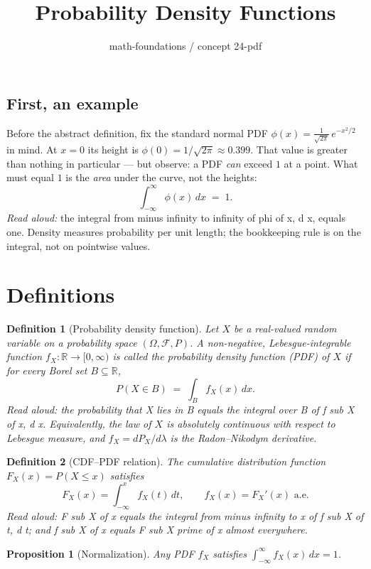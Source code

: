 \documentclass[11pt]{article}
\title{Probability Density Functions}
\author{math-foundations / concept 24-pdf}
\date{}
\newtheorem{definition}{Definition}
\newtheorem{proposition}{Proposition}
\begin{document}
\maketitle

\subsection*{First, an example}
Before the abstract definition, fix the standard normal PDF
$\phi(x) = \frac{1}{\sqrt{2\pi}}\,e^{-x^2/2}$ in mind.
At $x = 0$ its height is
$\phi(0) = 1/\sqrt{2\pi} \approx 0.399$.
That value is greater than nothing in particular --- but observe: a PDF
\emph{can} exceed $1$ at a point. What must equal $1$ is the
\emph{area} under the curve, not the heights:
\[
    \int_{-\infty}^{\infty} \phi(x)\,dx \;=\; 1.
\]
\emph{Read aloud:} the integral from minus infinity to infinity of phi of x, d x, equals one.
Density measures probability per unit length; the bookkeeping rule is
on the integral, not on pointwise values.

\section{Definitions}

\begin{definition}[Probability density function]
Let $X$ be a real-valued random variable on a probability space $(\Omega, \mathcal{F}, P)$. A non-negative, Lebesgue-integrable function $f_X : \mathbb{R} \to [0, \infty)$ is called the \emph{probability density function} (PDF) of $X$ if for every Borel set $B \subseteq \mathbb{R}$,
\[
    P(X \in B) \;=\; \int_B f_X(x)\,dx.
\]
\emph{Read aloud:} the probability that X lies in B equals the integral over B of f sub X of x, d x.
Equivalently, the law of $X$ is absolutely continuous with respect to Lebesgue measure, and $f_X = dP_X/d\lambda$ is the Radon--Nikodym derivative.
\end{definition}

\begin{definition}[CDF--PDF relation]
The cumulative distribution function $F_X(x) = P(X \le x)$ satisfies
\[
    F_X(x) = \int_{-\infty}^{x} f_X(t)\,dt, \qquad f_X(x) = F_X'(x) \text{ a.e.}
\]
\emph{Read aloud:} F sub X of x equals the integral from minus infinity to x of f sub X of t, d t; and f sub X of x equals F sub X prime of x almost everywhere.
\end{definition}

\begin{proposition}[Normalization]
Any PDF $f_X$ satisfies $\int_{-\infty}^{\infty} f_X(x)\,dx = 1$.
\end{proposition}
\end{document}
